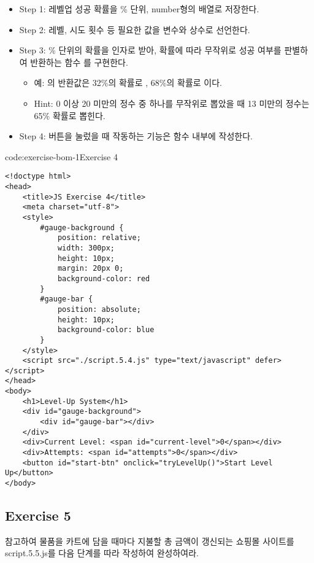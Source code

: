 \begin{itemize}
    \item Step 1: 레벨업 성공 확률을 \% 단위, number형의 배열로 저장한다.
    \item Step 2: 레벨, 시도 횟수 등 필요한 값을 변수와 상수로 선언한다.
    \item Step 3: \% 단위의 확률을 인자로 받아, 확률에 따라 무작위로 성공 여부를 판별하여 반환하는 함수 를 구현한다.
    \begin{itemize}
        \item 예: 의 반환값은 32\%의 확률로 , 68\%의 확률로 이다.
        \item Hint: 0 이상 20 미만의 정수 중 하나를 무작위로 뽑았을 때 13 미만의 정수는 65\% 확률로 뽑힌다.
    \end{itemize}
    \item Step 4: 버튼을 눌렀을 때 작동하는 기능은  함수 내부에 작성한다.
\end{itemize}

\begin{codeenv}{code:exercise-bom-1}{Exercise 4}\begin{verbatim}
<!doctype html>
<head>
    <title>JS Exercise 4</title>
    <meta charset="utf-8">
    <style>
        #gauge-background {
            position: relative;
            width: 300px;
            height: 10px;
            margin: 20px 0;
            background-color: red
        }
        #gauge-bar {
            position: absolute;
            height: 10px;
            background-color: blue
        }
    </style>
    <script src="./script.5.4.js" type="text/javascript" defer></script>
</head>
<body>
    <h1>Level-Up System</h1>
    <div id="gauge-background">
        <div id="gauge-bar"></div>
    </div>
    <div>Current Level: <span id="current-level">0</span></div>
    <div>Attempts: <span id="attempts">0</span></div>
    <button id="start-btn" onclick="tryLevelUp()">Start Level Up</button>
</body>
\end{verbatim}
\end{codeenv}

\subsection*{Exercise 5}

\을 참고하여 물품을 카트에 담을 때마다 지불할 총 금액이 갱신되는 쇼핑몰 사이트를 script.5.5.js를 다음 단계를 따라 작성하여 완성하여라.

